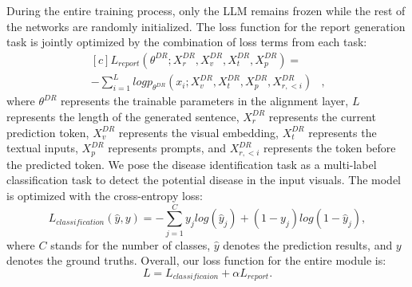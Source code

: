 During the entire training process, only the LLM remains frozen while the rest of the networks are randomly initialized. The loss function for the report generation task is jointly optimized by the combination of loss terms from each task: 
\begin{equation}
\begin{aligned}[c]
L_{report}(\theta^{DR};X_r^{DR},X_v^{DR}, X_t^{DR},X_p^{DR})=&\\ 
    -\sum^{L}_{i=1}logp_{\theta^{DR}}(x_i;X_v^{DR},X_t^{DR},X_p^{DR},X_{r,<i}^{DR}) &, 
\end{aligned}
\end{equation}
where $\theta^{DR}$ represents the trainable parameters in the alignment layer, $L$ represents the length of the generated sentence, $X_r^{DR}$ represents the current prediction token, $X_v^{DR}$ represents the visual embedding, $X_t^{DR}$ represents the textual inputs, $X_p^{DR}$ represents prompts, and $X_{r,<i}^{DR}$ represents the token before the predicted token. We pose the disease identification task as a multi-label classification task to detect the potential disease in the input visuals. The model is optimized with the cross-entropy loss:
\begin{equation}
    L_{classification}(\hat{y}, y) = -\sum^C_{j=1}y_jlog(\hat{y}_j) + (1-y_j)log(1-\hat{y}_j),
\end{equation}
where $C$ stands for the number of classes, $\hat{y}$ denotes the prediction results, and $y$ denotes the ground truths. Overall, our loss function for the entire module is:
\begin{equation}\label{eq11}
    L = L_{classificaion} + \alpha L_{report}.
\end{equation}